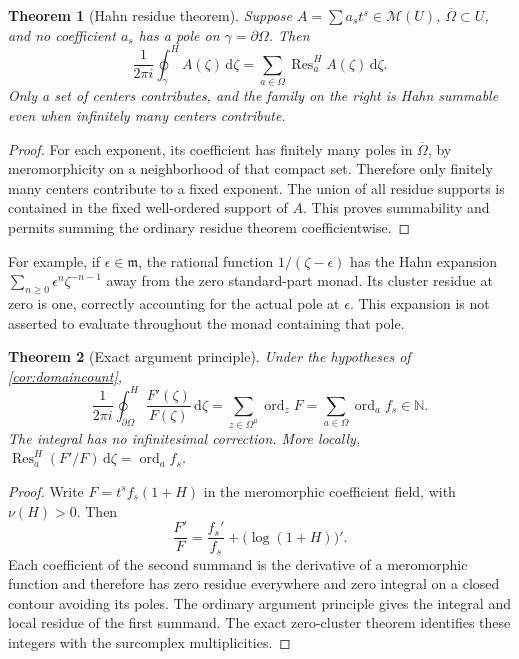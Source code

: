 \documentclass[11pt,oneside]{article}
\numberwithin{equation}{section}
\newtheorem{theorem}{Theorem}[section]
\theoremstyle{definition}
\theoremstyle{remark}\newtheorem{remark}[theorem]{Remark}
\newcommand{\N}{\mathbb N}
\newcommand{\MM}{\mathscr M}
\newcommand{\m}{\mathfrak m}
\newcommand{\Res}{\operatorname{Res}}
\newcommand{\ord}{\operatorname{ord}}
\newcommand{\hoint}{\mathop{\oint}\nolimits^{\!H}}
\newcommand{\dd}{\,\mathrm d}
\begin{document}
\begin{theorem}[Hahn residue theorem]\label{thm:Hresidue}
Suppose $A=\sum a_s t^s\in\MM(U)$, $\overline\Omega\subset U$, and no
coefficient $a_s$ has a pole on $\gamma=\partial\Omega$. Then
\begin{equation}\label{eq:Hresidue}
 \frac1{2\pi i}\hoint_\gamma A(\zeta)\dd\zeta
   =\sum_{a\in\Omega}\Res_a^H A(\zeta)\dd\zeta.
\end{equation}
Only a set of centers contributes, and the family on the right is
Hahn summable even when infinitely many centers contribute.
\end{theorem}
\begin{proof}
For each exponent, its coefficient has finitely many poles in
$\overline\Omega$, by meromorphicity on a neighborhood of that compact
set. Therefore only finitely many centers contribute to a fixed
exponent. The union of all residue supports is contained in the fixed
well-ordered support of $A$. This proves summability and permits summing
the ordinary residue theorem coefficientwise.
\end{proof}
For example, if $\epsilon\in\m$, the rational function
$1/(\zeta-\epsilon)$ has the Hahn expansion
$\sum_{n\geq0}\epsilon^n\zeta^{-n-1}$ away from the zero standard-part
monad. Its cluster residue at zero is one, correctly accounting for the
actual pole at $\epsilon$. This expansion is not asserted to evaluate
throughout the monad containing that pole.

\begin{theorem}[Exact argument principle]\label{thm:argument}
Under the hypotheses of \cref{cor:domaincount},
\begin{equation}\label{eq:argument}
 \frac1{2\pi i}\hoint_{\partial\Omega}\frac{F'(\zeta)}{F(\zeta)}\dd\zeta
 =\sum_{z\in\Omega^\mu}\ord_zF
 =\sum_{a\in\Omega}\ord_a f_s\in\N.
\end{equation}
The integral has no infinitesimal correction. More locally,
$\Res_a^H(F'/F)\dd\zeta=\ord_a f_s$.
\end{theorem}
\begin{proof}
Write $F=t^sf_s(1+H)$ in the meromorphic coefficient field, with
$\nu(H)>0$. Then
\[
 \frac{F'}F=\frac{f_s'}{f_s}+\bigl(\log(1+H)\bigr)'.
\]
Each coefficient of the second summand is the derivative of a
meromorphic function and therefore has zero residue everywhere and zero
integral on a closed contour avoiding its poles. The ordinary argument
principle gives the integral and local residue of the first summand.
The exact zero-cluster theorem identifies these integers with the
surcomplex multiplicities.
\end{proof}
\end{document}
